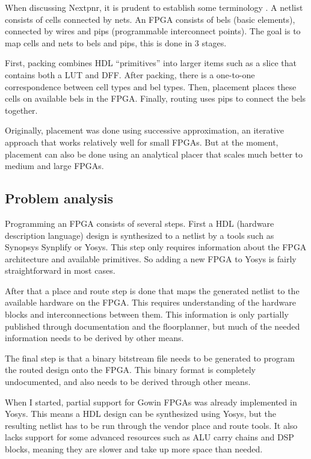\documentclass{article}
\begin{document}
When discussing Nextpnr, it is prudent to establish some terminology \cite{nexpnrfaq}. A netlist consists of cells connected by nets. An FPGA consists of bels (basic elements), connected by wires and pips (programmable interconnect points). The goal is to map cells and nets to bels and pips, this is done in 3 stages.

First, packing combines HDL ``primitives'' into larger items such as a slice that contains both a LUT and DFF. After packing, there is a one-to-one correspondence between cell types and bel types. Then, placement places these cells on available bels in the FPGA. Finally, routing uses pips to connect the bels together.

Originally, placement was done using successive approximation, an iterative approach that works relatively well for small FPGAs. But at the moment, placement can also be done using an analytical placer that scales much better to medium and large FPGAs.

\subsection{Problem analysis}

Programming an FPGA consists of several steps. First a HDL (hardware description language) design is synthesized to a netlist by a tools such as Synopsys Synplify or Yosys. This step only requires information about the FPGA architecture and available primitives. So adding a new FPGA to Yosys is fairly straightforward in most cases.

After that a place and route step is done that maps the generated netlist to the available hardware on the FPGA. This requires understanding of the hardware blocks and interconnections between them. This information is only partially published through documentation and the floorplanner, but much of the needed information needs to be derived by other means.

The final step is that a binary bitstream file needs to be generated to program the routed design onto the FPGA. This binary format is completely undocumented, and also needs to be derived through other means.

When I started, partial support for Gowin FPGAs was already implemented in Yosys. This means a HDL design can be synthesized using Yosys, but the resulting netlist has to be run through the vendor place and route tools. It also lacks support for some advanced resources such as ALU carry chains and DSP blocks, meaning they are slower and take up more space than needed.
\end{document}
